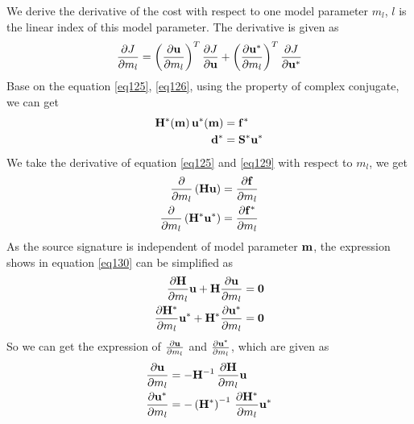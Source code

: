 \documentclass[revised,endfloat]{geophysics}
\begin{document}
We derive the derivative of the cost with respect to one model parameter $m_l$, $l$ is the linear index of this model parameter. The derivative is given as 
\begin{equation}
\frac{\partial J}{\partial m_l} = \left( \frac{\partial {\bf u}}{\partial m_l} \right)^T \frac{\partial J}{\partial {\bf u}} + \left( \frac{\partial {\bf u^*}}{\partial m_l} \right)^T \frac{\partial J}{\partial {\bf u^*}}
\label{eq128}
\end{equation}
Base on the equation \ref{eq125}, \ref{eq126}, using the property of complex conjugate, we can get
\begin{equation}
\begin{split}
{\bf H}^*({\bf m}) \, {\bf u}^*({\bf m})& = {\bf f}^* \\
{\bf d}^* &= {\bf S}^*{\bf u}^*
\end{split}
\label{eq129}
\end{equation}
We take the derivative of equation \ref{eq125} and \ref{eq129} with respect to $m_l$, we get 
\begin{equation}
\begin{split}
\frac{\partial }{\partial m_l} \left({\bf Hu} \right) &= \frac{\partial {\bf f}}{\partial m_l} \\
\frac{\partial }{\partial m_l} \left({\bf H}^* {\bf u}^* \right) &= \frac{\partial {\bf f}^*}{\partial m_l} \\
\end{split}
\label{eq130}
\end{equation}
As the source signature is independent of model parameter ${\bf m}$, the expression shows in equation \ref{eq130} can be simplified as
\begin{equation}
\begin{split}
\frac{\partial {\bf H}}{\partial m_l} {\bf u} + {\bf H} \frac{\partial {\bf u}}{\partial m_l}&= {\bf 0}\\
\frac{\partial {\bf H}^*}{\partial m_l} {\bf u}^* + {\bf H}^* \frac{\partial {\bf u}^*}{\partial m_l}&= {\bf 0}\\
\end{split}
\label{eq131}
\end{equation}
So we can get the expression of $\frac{\partial {\bf u}}{\partial m_l}$ and $\frac{\partial {\bf u}^*}{\partial m_l}$, which are given as 
\begin{equation}
\begin{split}
\frac{\partial {\bf u}}{\partial m_l}&= - {\bf H}^{-1} \,\frac{\partial {\bf H}}{\partial m_l} {\bf u} \\
\frac{\partial {\bf u}^*}{\partial m_l}&=  -\left({\bf H}^*\right)^{-1}  \, \frac{\partial {\bf H}^*}{\partial m_l} {\bf u}^*\\
\end{split}
\label{eq132}
\end{equation}
\end{document}
